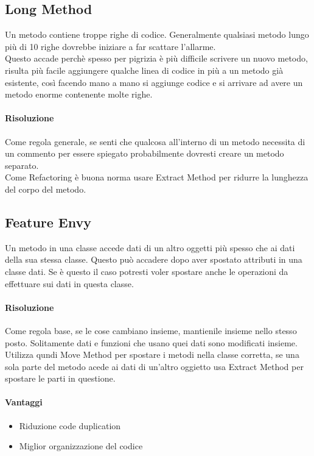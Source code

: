 \subsection{Long Method}
Un metodo contiene troppe righe di codice. Generalmente qualsiasi metodo lungo più di 10 righe
dovrebbe iniziare a far scattare l'allarme.\\
Questo accade perchè spesso per pigrizia è più difficile scrivere un nuovo metodo, risulta
più facile aggiungere qualche linea di codice in più a un metodo già esistente, così facendo
mano a mano si aggiunge codice e si arrivare ad avere un metodo enorme contenente molte righe.\\
\paragraph*{Risoluzione} Come regola generale, se senti che qualcosa all'interno di un metodo
necessita di un commento per essere spiegato probabilmente dovresti creare un metodo separato.\\
Come Refactoring è buona norma usare Extract Method per ridurre la lunghezza del corpo del
metodo.
\subsection{Feature Envy}
Un metodo in una classe accede dati di un altro oggetti più spesso che ai dati della sua stessa
classe. Questo può accadere dopo aver spostato attributi in una classe dati. Se è questo il caso
potresti voler spostare anche le operazioni da effettuare sui dati in questa classe.\\
\paragraph*{Risoluzione} Come regola base, se le cose cambiano insieme, mantienile insieme nello
stesso posto. Solitamente dati e funzioni che usano quei dati sono modificati insieme.\\
Utilizza qundi Move Method per spostare i metodi nella classe corretta, se una sola parte del
metodo acede ai dati di un'altro oggietto usa Extract Method per spostare le parti in questione.
\paragraph*{Vantaggi}
\begin{itemize}
    \item Riduzione code duplication
    \item Miglior organizzazione del codice
\end{itemize}
